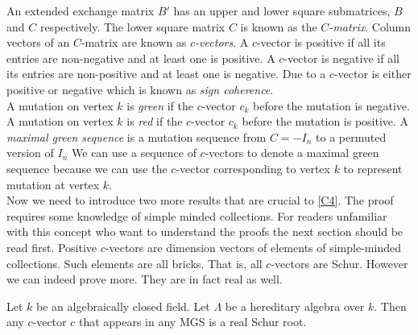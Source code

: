 \indent An extended exchange matrix $B'$ has an upper and lower square submatrices, $B$ and $C$ respectively. The lower square matrix $C$ is known as the $C$\textit{-matrix}. Column vectors of an $C$-matrix are known as $c$\textit{-vectors}. A $c$-vector is positive if all its entries are non-negative and at least one is positive. A $c$-vector is negative if all its entries are non-positive and at least one is negative. Due to \cite{GHKK14} a $c$-vector is either positive or negative which is known as \textit{sign coherence}.\\
\indent A mutation on vertex $k$ is \textit{green} if the $c$-vector $c_k$ before the mutation is negative.  A mutation on vertex $k$ is \textit{red} if the $c$-vector $c_k$ before the mutation is positive. A \textit{maximal green sequence} is a mutation sequence from $C=-I_n$ to a permuted version of $I_n$ We can use a sequence of $c$-vectors to denote a maximal green sequence because we can use the $c$-vector corresponding to vertex $k$ to represent mutation at vertex $k$.\\
\indent Now we need to introduce two more results that are crucial to \ref{C4}. The proof requires some knowledge of simple minded collections. For readers unfamiliar with this concept who want to understand the proofs the next section should be read first. 
\indent Positive $c$-vectors are dimension vectors of elements of simple-minded collections. Such elements are all bricks. That is, all $c$-vectors are Schur. However we can indeed prove more. They are in fact real as well.\\
\begin{lemma}
Let $k$ be an algebraically closed field. Let $\Lambda$ be a hereditary algebra over $k$. Then any $c$-vector $c$ that appears in any MGS is a real Schur root.
\end{lemma}
